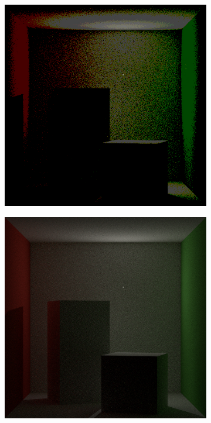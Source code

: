 \begin{figure}[]
    \centering
    \begin{subfigure}[b]{0.48\textwidth}
        \centering
        \includegraphics[width=\textwidth]{images/03-floating_point16.jpg}
        \caption{}
        \label{fig:methods_float16}
    \end{subfigure}
    \hfill
    \begin{subfigure}[b]{0.48\textwidth}
        \centering
        \includegraphics[width=\textwidth]{images/03-floating_point32.jpg}

\end{subfigure}
\end{figure}
